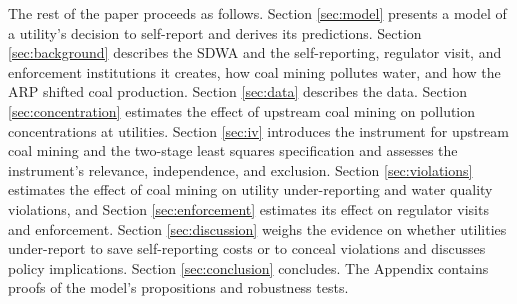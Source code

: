 \documentclass[12pt]{article}
\begin{document}
The rest of the paper proceeds as follows. Section \ref{sec:model} presents a model of a utility's decision to self-report and derives its predictions. Section \ref{sec:background} describes the SDWA and the self-reporting, regulator visit, and enforcement institutions it creates, how coal mining pollutes water, and how the ARP shifted coal production. Section \ref{sec:data} describes the data. Section \ref{sec:concentration} estimates the effect of upstream coal mining on pollution concentrations at utilities. Section \ref{sec:iv} introduces the instrument for upstream coal mining and the two-stage least squares specification and assesses the instrument's relevance, independence, and exclusion. Section \ref{sec:violations} estimates the effect of coal mining on utility under-reporting and water quality violations, and Section \ref{sec:enforcement} estimates its effect on regulator visits and enforcement. Section \ref{sec:discussion} weighs the evidence on whether utilities under-report to save self-reporting costs or to conceal violations and discusses policy implications. Section \ref{sec:conclusion} concludes. The Appendix contains proofs of the model's propositions and robustness tests.




\end{document}
